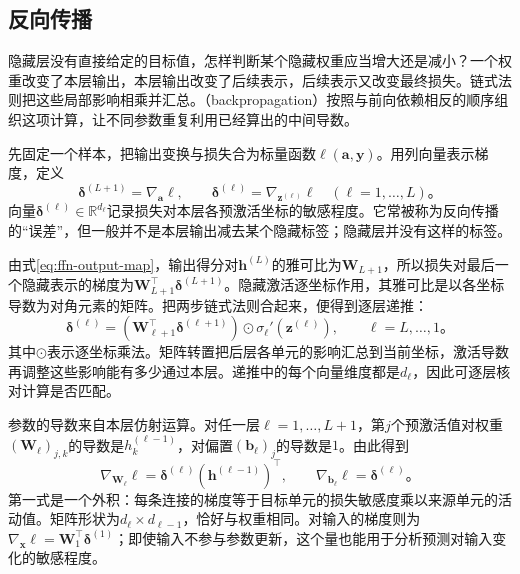 \subsection{反向传播}
\label{sec:ffn-backpropagation}

隐藏层没有直接给定的目标值，怎样判断某个隐藏权重应当增大还是减小？一个权重改变了本层输出，本层输出改变了后续表示，后续表示又改变最终损失。链式法则把这些局部影响相乘并汇总。（backpropagation）按照与前向依赖相反的顺序组织这项计算，让不同参数重复利用已经算出的中间导数。

先固定一个样本，把输出变换与损失合为标量函数$\ell(\bm{a},\bm{y})$。用列向量表示梯度，定义
\begin{equation}
  \bm{\delta}^{(L+1)}=\nabla_{\bm{a}}\ell,
  \qquad
  \bm{\delta}^{(\ell)}=\nabla_{\bm{z}^{(\ell)}}\ell
  \quad(\ell=1,\ldots,L)\text{。}
  \label{eq:ffn-delta-definition}
\end{equation}
向量$\bm{\delta}^{(\ell)}\in\mathbb{R}^{d_\ell}$记录损失对本层各预激活坐标的敏感程度。它常被称为反向传播的“误差”，但一般并不是本层输出减去某个隐藏标签；隐藏层并没有这样的标签。

由式\eqref{eq:ffn-output-map}，输出得分对$\bm{h}^{(L)}$的雅可比为$\bm{W}_{L+1}$，所以损失对最后一个隐藏表示的梯度为$\bm{W}_{L+1}^{\top}\bm{\delta}^{(L+1)}$。隐藏激活逐坐标作用，其雅可比是以各坐标导数为对角元素的矩阵。把两步链式法则合起来，便得到逐层递推：
\begin{equation}
  \bm{\delta}^{(\ell)}=
  \left(\bm{W}_{\ell+1}^{\top}\bm{\delta}^{(\ell+1)}\right)
  \odot\sigma_\ell'\!\left(\bm{z}^{(\ell)}\right),
  \qquad \ell=L,\ldots,1\text{。}
  \label{eq:ffn-backward-recursion}
\end{equation}
其中$\odot$表示逐坐标乘法。矩阵转置把后层各单元的影响汇总到当前坐标，激活导数再调整这些影响能有多少通过本层。递推中的每个向量维度都是$d_\ell$，因此可逐层核对计算是否匹配。

参数的导数来自本层仿射运算。对任一层$\ell=1,\ldots,L+1$，第$j$个预激活值对权重$(\bm{W}_\ell)_{j,k}$的导数是$h_k^{(\ell-1)}$，对偏置$(\bm{b}_\ell)_j$的导数是$1$。由此得到
\begin{equation}
  \nabla_{\bm{W}_\ell}\ell
    =\bm{\delta}^{(\ell)}(\bm{h}^{(\ell-1)})^{\top},
  \qquad
  \nabla_{\bm{b}_\ell}\ell=\bm{\delta}^{(\ell)}\text{。}
  \label{eq:ffn-parameter-gradients}
\end{equation}
第一式是一个外积：每条连接的梯度等于目标单元的损失敏感度乘以来源单元的活动值。矩阵形状为$d_\ell\times d_{\ell-1}$，恰好与权重相同。对输入的梯度则为$\nabla_{\bm{x}}\ell=\bm{W}_1^{\top}\bm{\delta}^{(1)}$；即使输入不参与参数更新，这个量也能用于分析预测对输入变化的敏感程度。

